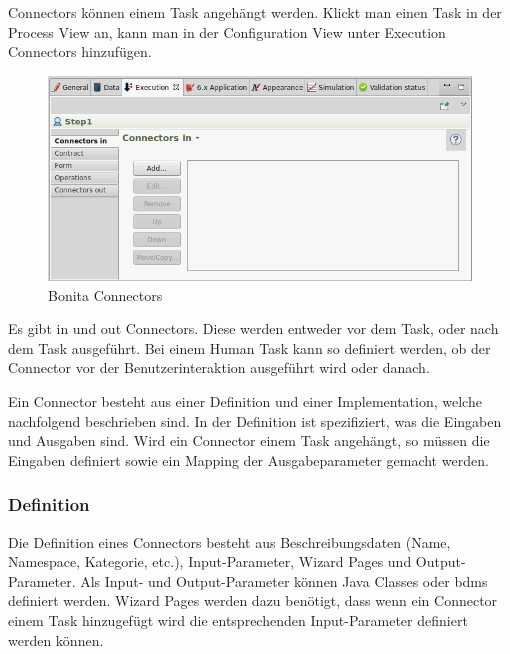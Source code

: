 Connectors können einem Task angehängt werden. Klickt man einen Task in der Process View an, kann man in der Configuration View unter Execution Connectors hinzufügen.
\begin{figure}[H]
	\centering
	\includegraphics[width=1\textwidth]{images/bonita-connectors.png}
	\caption{Bonita Connectors}
	\label{fig:analyse:bonita:connectors}
\end{figure}
Es gibt in und out Connectors. Diese werden entweder vor dem Task, oder nach dem Task ausgeführt. Bei einem Human Task kann so definiert werden, ob der Connector vor der Benutzerinteraktion ausgeführt wird oder danach.

Ein Connector besteht aus einer Definition und einer Implementation, welche nachfolgend beschrieben sind. In der Definition ist spezifiziert, was die Eingaben und Ausgaben sind. Wird ein Connector einem Task angehängt, so müssen die Eingaben definiert sowie ein Mapping der Ausgabeparameter gemacht werden.

\subsubsection{Definition}
Die Definition eines Connectors besteht aus Beschreibungsdaten (Name, Namespace, Kategorie, etc.), Input-Parameter, Wizard Pages und Output-Parameter. Als Input- und Output-Parameter können Java Classes oder \glspl{bdm} definiert werden. Wizard Pages werden dazu benötigt, dass wenn ein Connector einem Task hinzugefügt wird die entsprechenden Input-Parameter definiert werden können.

